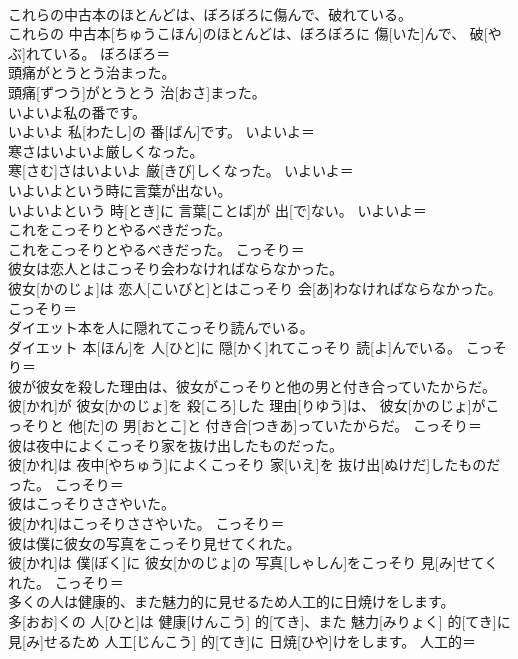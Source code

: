 \documentclass[8pt]{extreport}
\begin{document}
\begin{CJK}{UTF8}{min}
\\	これらの中古本のほとんどは、ぼろぼろに傷んで、破れている。	
\\	これらの 中古本[ちゅうこほん]のほとんどは、ぼろぼろに 傷[いた]んで、 破[やぶ]れている。	ぼろぼろ＝ 
\\	頭痛がとうとう治まった。	
\\	頭痛[ずつう]がとうとう 治[おさ]まった。	
\\	いよいよ私の番です。	
\\	いよいよ 私[わたし]の 番[ばん]です。	いよいよ＝ 
\\	寒さはいよいよ厳しくなった。	
\\	寒[さむ]さはいよいよ 厳[きび]しくなった。	いよいよ＝ 
\\	いよいよという時に言葉が出ない。	
\\	いよいよという 時[とき]に 言葉[ことば]が 出[で]ない。	いよいよ＝ 
\\	これをこっそりとやるべきだった。	
\\	これをこっそりとやるべきだった。	こっそり＝ 
\\	彼女は恋人とはこっそり会わなければならなかった。	
\\	彼女[かのじょ]は 恋人[こいびと]とはこっそり 会[あ]わなければならなかった。	こっそり＝ 
\\	ダイエット本を人に隠れてこっそり読んでいる。	
\\	ダイエット 本[ほん]を 人[ひと]に 隠[かく]れてこっそり 読[よ]んでいる。	こっそり＝ 
\\	彼が彼女を殺した理由は、彼女がこっそりと他の男と付き合っていたからだ。	
\\	彼[かれ]が 彼女[かのじょ]を 殺[ころ]した 理由[りゆう]は、 彼女[かのじょ]がこっそりと 他[た]の 男[おとこ]と 付き合[つきあ]っていたからだ。	こっそり＝ 
\\	彼は夜中によくこっそり家を抜け出したものだった。	
\\	彼[かれ]は 夜中[やちゅう]によくこっそり 家[いえ]を 抜け出[ぬけだ]したものだった。	こっそり＝ 
\\	彼はこっそりささやいた。	
\\	彼[かれ]はこっそりささやいた。	こっそり＝ 
\\	彼は僕に彼女の写真をこっそり見せてくれた。	
\\	彼[かれ]は 僕[ぼく]に 彼女[かのじょ]の 写真[しゃしん]をこっそり 見[み]せてくれた。	こっそり＝ 
\\	多くの人は健康的、また魅力的に見せるため人工的に日焼けをします。	
\\	多[おお]くの 人[ひと]は 健康[けんこう] 的[てき]、また 魅力[みりょく] 的[てき]に 見[み]せるため 人工[じんこう] 的[てき]に 日焼[ひや]けをします。	人工的＝ 

\end{CJK}
\end{document}
